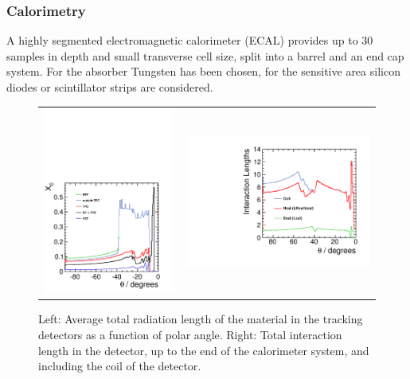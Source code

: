 \subsubsection{Calorimetry}
A highly segmented electromagnetic calorimeter (ECAL) provides up to 30 samples in depth and small transverse cell size, split into a barrel and an end cap system. For the absorber Tungsten has been chosen, for the sensitive area silicon diodes or scintillator strips are considered.
\begin{figure}[t!]
\begin{tabular}{cc}
\includegraphics[width=0.52\hsize,viewport={0 -10 600 500},clip]{chapters/figures/material-budget-new.pdf} &
\includegraphics[width=0.5\hsize]{chapters/figures/intlen_ILD_o1_v05.pdf}
\end{tabular}
\caption[Material in the ILD detector]{Left: Average total radiation length of the material
  in the tracking detectors as a function of polar angle. Right: Total interaction length in the detector, up to the end of the calorimeter system, and including the coil of the detector.}
\label{fig:intro:material}

\end{figure}

